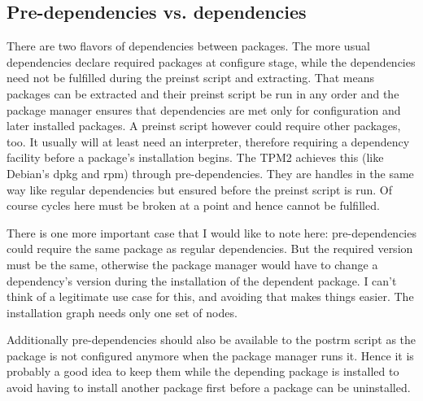 \documentclass[a4paper]{scrartcl}
\begin{document}
	\subsection{Pre-dependencies vs. dependencies}
	\label{sec:pre_dependencies_vs_dependencies}
	
	There are two flavors of dependencies between packages. The more usual dependencies declare required packages at configure stage, while the dependencies need not be fulfilled during the preinst script and extracting. That means packages can be extracted and their preinst script be run in any order and the package manager ensures that dependencies are met only for configuration and later installed packages. A preinst script however could require other packages, too. It usually will at least need an interpreter, therefore requiring a dependency facility before a package's installation begins. The TPM2 achieves this (like Debian's dpkg and rpm) through pre-dependencies. They are handles in the same way like regular dependencies but ensured before the preinst script is run. Of course cycles here must be broken at a point and hence cannot be fulfilled.
	
	There is one more important case that I would like to note here: pre-dependencies could require the same package as regular dependencies. But the required version must be the same, otherwise the package manager would have to change a dependency's version during the installation of the dependent package. I can't think of a legitimate use case for this, and avoiding that makes things easier. The installation graph needs only one set of nodes.
	
	Additionally pre-dependencies should also be available to the postrm script as the package is not configured anymore when the package manager runs it. Hence it is probably a good idea to keep them while the depending package is installed to avoid having to install another package first before a package can be uninstalled.
	
\end{document}
